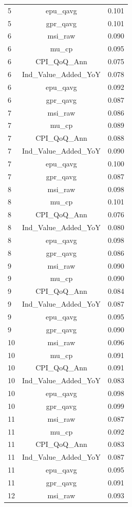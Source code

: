 \begin{table}[!htbp]
\begin{threeparttable}
\begin{tabular}{lcc}
5 & epu\_qavg & 0.101 \\
5 & gpr\_qavg & 0.101 \\
6 & msi\_raw & 0.090 \\
6 & mu\_cp & 0.095 \\
6 & CPI\_QoQ\_Ann & 0.075 \\
6 & Ind\_Value\_Added\_YoY & 0.078 \\
6 & epu\_qavg & 0.092 \\
6 & gpr\_qavg & 0.087 \\
7 & msi\_raw & 0.086 \\
7 & mu\_cp & 0.089 \\
7 & CPI\_QoQ\_Ann & 0.088 \\
7 & Ind\_Value\_Added\_YoY & 0.090 \\
7 & epu\_qavg & 0.100 \\
7 & gpr\_qavg & 0.087 \\
8 & msi\_raw & 0.098 \\
8 & mu\_cp & 0.101 \\
8 & CPI\_QoQ\_Ann & 0.076 \\
8 & Ind\_Value\_Added\_YoY & 0.080 \\
8 & epu\_qavg & 0.098 \\
8 & gpr\_qavg & 0.086 \\
9 & msi\_raw & 0.090 \\
9 & mu\_cp & 0.090 \\
9 & CPI\_QoQ\_Ann & 0.084 \\
9 & Ind\_Value\_Added\_YoY & 0.087 \\
9 & epu\_qavg & 0.095 \\
9 & gpr\_qavg & 0.090 \\
10 & msi\_raw & 0.096 \\
10 & mu\_cp & 0.091 \\
10 & CPI\_QoQ\_Ann & 0.091 \\
10 & Ind\_Value\_Added\_YoY & 0.083 \\
10 & epu\_qavg & 0.098 \\
10 & gpr\_qavg & 0.099 \\
11 & msi\_raw & 0.087 \\
11 & mu\_cp & 0.092 \\
11 & CPI\_QoQ\_Ann & 0.083 \\
11 & Ind\_Value\_Added\_YoY & 0.087 \\
11 & epu\_qavg & 0.095 \\
11 & gpr\_qavg & 0.091 \\
12 & msi\_raw & 0.093 \\

\end{tabular}
\end{threeparttable}
\end{table}
